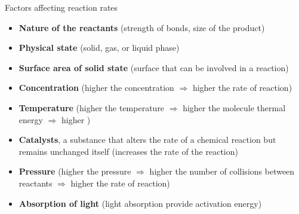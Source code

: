 \begin{frame}[<+->]{Factors affecting reaction rates}
	
	\begin{itemize}
		\item {\bf Nature of the reactants} (strength of bonds, size of the product)
		\item {\bf Physical state} (solid, gas, or liquid phase)
		\item {\bf Surface area of solid state} (surface that can be involved in a reaction)
		\item {\bf Concentration} (higher the concentration $\Rightarrow$ higher the rate of reaction)
		\item {\bf Temperature} (higher the temperature $\Rightarrow$ higher the molecule thermal energy $\Rightarrow$ higher )
		\item {\bf Catalysts}, a substance that alters the rate of a chemical reaction but remains unchanged itself (increases the rate of the reaction)
		\item {\bf Pressure} (higher the pressure $\Rightarrow$ higher the number of collisions between reactants $\Rightarrow$ higher the rate of reaction)
		\item {\bf Absorption of light} (light absorption provide activation energy)
	\end{itemize}
	
\end{frame}
%
%
